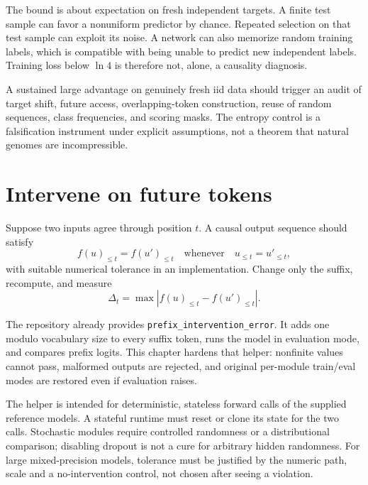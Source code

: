 
The bound is about expectation on fresh independent targets. A finite test sample can favor a nonuniform predictor by chance. Repeated selection on that test sample can exploit its noise. A network can also memorize random training labels,\cite{e2zhang} which is compatible with being unable to predict new independent labels. Training loss below $\ln4$ is therefore not, alone, a causality diagnosis.

A sustained large advantage on genuinely fresh iid data should trigger an audit of target shift, future access, overlapping-token construction, reuse of random sequences, class frequencies, and scoring masks. The entropy control is a falsification instrument under explicit assumptions, not a theorem that natural genomes are incompressible.

\section{Intervene on future tokens}
Suppose two inputs agree through position $t$. A causal output sequence should satisfy
\[
f(u)_{\le t}=f(u')_{\le t}
\quad\text{whenever}\quad u_{\le t}=u'_{\le t},
\]
with suitable numerical tolerance in an implementation. Change only the suffix, recompute, and measure
\[
\Delta_t=\max\left|f(u)_{\le t}-f(u')_{\le t}\right|.
\]


The repository already provides \texttt{prefix\_intervention\_error}. It adds one modulo vocabulary size to every suffix token, runs the model in evaluation mode, and compares prefix logits. This chapter hardens that helper: nonfinite values cannot pass, malformed outputs are rejected, and original per-module train/eval modes are restored even if evaluation raises.

The helper is intended for deterministic, stateless forward calls of the supplied reference models. A stateful runtime must reset or clone its state for the two calls. Stochastic modules require controlled randomness or a distributional comparison; disabling dropout is not a cure for arbitrary hidden randomness. For large mixed-precision models, tolerance must be justified by the numeric path, scale and a no-intervention control, not chosen after seeing a violation.

